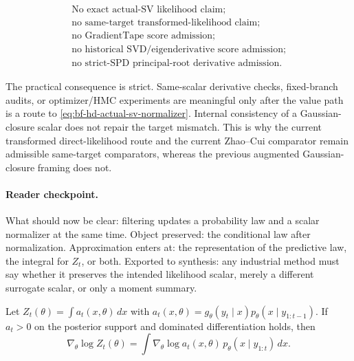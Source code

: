 \begin{equation}
  \boxed{
  \begin{gathered}
  \text{No exact actual-SV likelihood claim;}\\
  \text{no same-target transformed-likelihood claim;}\\
  \text{no GradientTape score admission;}\\
  \text{no historical SVD/eigenderivative score admission;}\\
  \text{no strict-SPD principal-root derivative admission.}
  \end{gathered}}
  \label{eq:bf-hd-actual-sv-srukf-nonclaims}
\end{equation}

The practical consequence is strict.  Same-scalar derivative checks, fixed-branch
audits, or optimizer/HMC experiments are meaningful only after the value path is
a route to \eqref{eq:bf-hd-actual-sv-normalizer}.  Internal consistency of a
Gaussian-closure scalar does not repair the target mismatch.  This is why the
current transformed direct-likelihood route and the current Zhao--Cui comparator
remain admissible same-target comparators, whereas the previous augmented
Gaussian-closure framing does not.

\paragraph{Reader checkpoint.}
What should now be clear: filtering updates a probability law and a scalar
normalizer at the same time.  Object preserved: the conditional law after
normalization.  Approximation enters at: the representation of the predictive
law, the integral for \(Z_t\), or both.  Exported to synthesis: any industrial
method must say whether it preserves the intended likelihood scalar, merely a
different surrogate scalar, or only a moment summary.

\begin{proposition}
\label{prop:bf-hd-score}
Let $Z_t(\theta)=\int a_t(x,\theta)\,dx$ with
$a_t(x,\theta)=g_\theta(y_t\mid x)p_\theta(x\mid y_{1:t-1})$.  If
$a_t>0$ on the posterior support and dominated differentiation holds, then
\begin{equation}
  \nabla_\theta\log Z_t(\theta)
  =
  \int \nabla_\theta\log a_t(x,\theta)\,
       p_\theta(x\mid y_{1:t})\,dx .
  \label{eq:bf-hd-score}
\end{equation}
\end{proposition}

